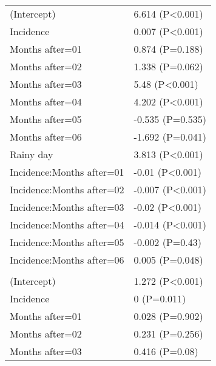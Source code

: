 \documentclass[]{article}
\begin{document}
\begin{longtable}[t]{ll}
\hspace{1em}(Intercept) & 6.614 (P<0.001)\\
\hspace{1em}Incidence & 0.007 (P<0.001)\\
\hspace{1em}Months after=01 & 0.874 (P=0.188)\\
\hspace{1em}Months after=02 & 1.338 (P=0.062)\\
\hspace{1em}Months after=03 & 5.48 (P<0.001)\\
\hspace{1em}Months after=04 & 4.202 (P<0.001)\\
\hspace{1em}Months after=05 & -0.535 (P=0.535)\\
\hspace{1em}Months after=06 & -1.692 (P=0.041)\\
\hspace{1em}Rainy day & 3.813 (P<0.001)\\
\hspace{1em}Incidence:Months after=01 & -0.01 (P<0.001)\\
\hspace{1em}Incidence:Months after=02 & -0.007 (P<0.001)\\
\hspace{1em}Incidence:Months after=03 & -0.02 (P<0.001)\\
\hspace{1em}Incidence:Months after=04 & -0.014 (P<0.001)\\
\hspace{1em}Incidence:Months after=05 & -0.002 (P=0.43)\\
\hspace{1em}Incidence:Months after=06 & 0.005 (P=0.048)\\
\addlinespace[1.5em]
\multicolumn{2}{l}{\textbf{Temporary field worker}}\\
\hspace{1em}(Intercept) & 1.272 (P<0.001)\\
\hspace{1em}Incidence & 0 (P=0.011)\\
\hspace{1em}Months after=01 & 0.028 (P=0.902)\\
\hspace{1em}Months after=02 & 0.231 (P=0.256)\\
\hspace{1em}Months after=03 & 0.416 (P=0.08)\\

\end{longtable}
\end{document}
